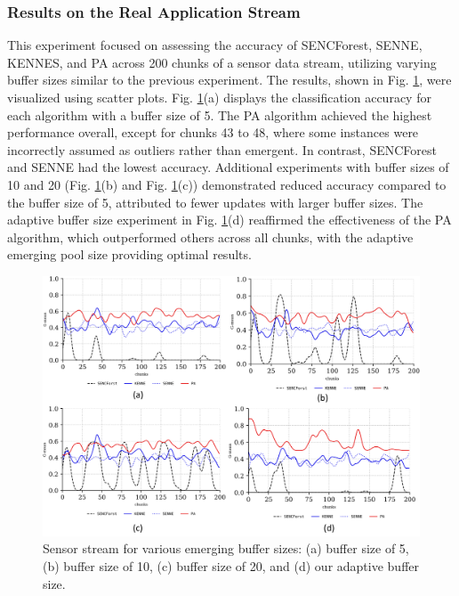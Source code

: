 \subsubsection{Results on the Real Application Stream}
This experiment focused on assessing the accuracy of SENCForest, SENNE, KENNES, and PA across 200 chunks of a sensor data stream, utilizing varying buffer sizes similar to the previous experiment. The results, shown in Fig. \ref{fig:5_result2}, were visualized using scatter plots. Fig. \ref{fig:5_result2}(a) displays the classification accuracy for each algorithm with a buffer size of 5. The PA algorithm achieved the highest performance overall, except for chunks 43 to 48, where some instances were incorrectly assumed as outliers rather than emergent. In contrast, SENCForest and SENNE had the lowest accuracy. Additional experiments with buffer sizes of 10 and 20 (Fig. \ref{fig:5_result2}(b) and Fig. \ref{fig:5_result2}(c)) demonstrated reduced accuracy compared to the buffer size of 5, attributed to fewer updates with larger buffer sizes. The adaptive buffer size experiment in Fig. \ref{fig:5_result2}(d) reaffirmed the effectiveness of the PA algorithm, which outperformed others across all chunks, with the adaptive emerging pool size providing optimal results.

\begin{figure}[!ht]
	\centering
	\includegraphics[width=1\linewidth]{5_Emerging/figures/result2}
	\caption{Sensor stream for various emerging buffer sizes: (a) buffer size of 5, (b) buffer size of 10, (c) buffer size of 20, and (d) our adaptive buffer size.}
	\label{fig:5_result2}
\end{figure}

